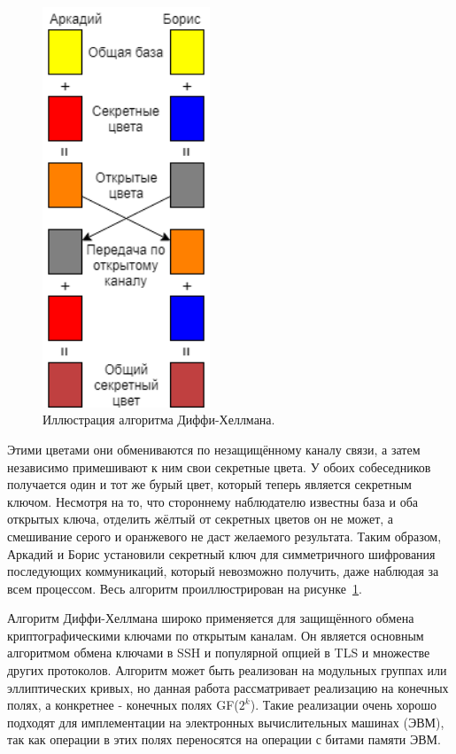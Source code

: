 \documentclass[times,specification,annotation]{itmo-student-thesis}
\begin{document}
\begin{figure}
\caption{Иллюстрация алгоритма Диффи-Хеллмана.}\label{wrap-fig:1}
\includegraphics[width=5cm]{graphics/DHKE_colours.png}
\end{figure}
Этими цветами они обмениваются по незащищённому каналу связи, а затем независимо примешивают к ним свои секретные цвета.
У обоих собеседников получается один и тот же бурый цвет, который теперь является секретным ключом.
Несмотря на то, что стороннему наблюдателю известны база и оба открытых ключа, отделить жёлтый от секретных цветов он не может,
а смешивание серого и оранжевого не даст желаемого результата.
Таким образом, Аркадий и Борис установили секретный ключ для симметричного шифрования последующих коммуникаций,
который невозможно получить, даже наблюдая за всем процессом.
Весь алгоритм проиллюстрирован на рисунке~\ref{wrap-fig:1}.\par
Алгоритм Диффи-Хеллмана широко применяется для защищённого обмена криптографическими ключами
по открытым каналам.
Он является основным алгоритмом обмена ключами в SSH и популярной опцией в TLS и множестве других протоколов.
Алгоритм может быть реализован на модульных группах или эллиптических кривых, но данная работа рассматривает
реализацию на конечных полях, а конкретнее - конечных полях GF($2^k$).
Такие реализации очень хорошо подходят для имплементации на электронных вычислительных машинах (ЭВМ),
так как операции в этих полях переносятся на операции с битами памяти ЭВМ.\par
\end{document}

